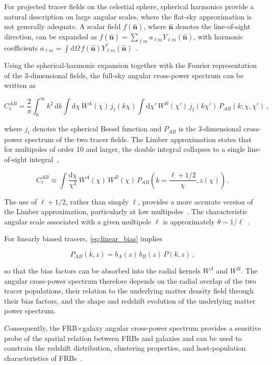 For projected tracer fields on the celestial sphere, spherical harmonics provide 
a natural description on large angular scales, where the flat-sky approximation is not 
generally adequate. A scalar field $f(\hat{\mathbf{n}})$, where $\hat{\mathbf{n}}$ denotes the line-of-sight direction, can be expanded
as $f(\hat{\mathbf{n}})=\sum_{\ell m} a_{\ell m}Y_{\ell m}(\hat{\mathbf{n}})$, 
with harmonic coefficients 
$a_{\ell m}=\int \mathrm{d}\Omega\,f(\hat{\mathbf{n}})Y_{\ell m}^{*}(\hat{\mathbf{n}})$~\cite{RafieiRavandi_2021}.

Using the spherical-harmonic expansion together with the Fourier
representation of the 3-dimensional fields, the full-sky angular
cross-power spectrum can be written as

\begin{equation}
    C_{\ell}^{AB}
    =
    \frac{2}{\pi}
    \int_0^\infty k^2\,\mathrm{d}k
    \int \mathrm{d}\chi\,
    W^{A}(\chi)\,
    j_{\ell}(k\chi)
    \int \mathrm{d}\chi'\,
    W^{B}(\chi')\,
    j_{\ell}(k\chi')\,
    P_{AB}(k;\chi,\chi') \,,
\end{equation}

where $j_{\ell}$ denotes the spherical Bessel function and
$P_{AB}$ is the 3-dimensional cross-power spectrum of the two
tracer fields. 
The Limber approximation states that
for multipoles of order 10 and larger, the double integral collapses to a single line-of-sight integral~\cite{Limber_1953},

\begin{equation}\label{eq:limber}
    C_{\ell}^{AB}
    \approx
    \int \frac{\mathrm{d}\chi}{\chi^2}\,
    W^{A}(\chi)\,
    W^{B}(\chi)\,
    P_{AB}
    \left(
        k = \frac{\ell+1/2}{\chi},
        z(\chi)
    \right) \,.
\end{equation}

The use of $\ell+1/2$, rather than simply $\ell$, provides a more accurate
version of the Limber approximation, particularly at low
multipoles~\cite{LoVerdeAfshordi_2008}.
The characteristic angular scale associated with a given multipole $\ell$ is approximately $\theta \sim 1/\ell$~\cite{RafieiRavandi_2021}.

For linearly biased tracers, \autoref{eq:linear_bias} implies

\begin{equation}\label{eq:p_ab}
    P_{AB}(k, z) = b_A(z)\, b_B(z)\, P(k, z) \,,
\end{equation}

so that the bias factors can be absorbed into the radial kernels $W^A$ and $W^B$.
The angular cross-power spectrum therefore depends
on the radial overlap of the two tracer populations, their relation to the
underlying matter density field through their bias factors, and the shape
and redshift evolution of the underlying matter power spectrum.

Consequently, the FRB$\times$galaxy angular cross-power spectrum provides a
sensitive probe of the spatial relation between FRBs and galaxies and can
be used to constrain the redshift distribution, clustering properties,
and host-population characteristics of FRBs~\cite{RafieiRavandi_2021,
Shirasaki_2017}.
